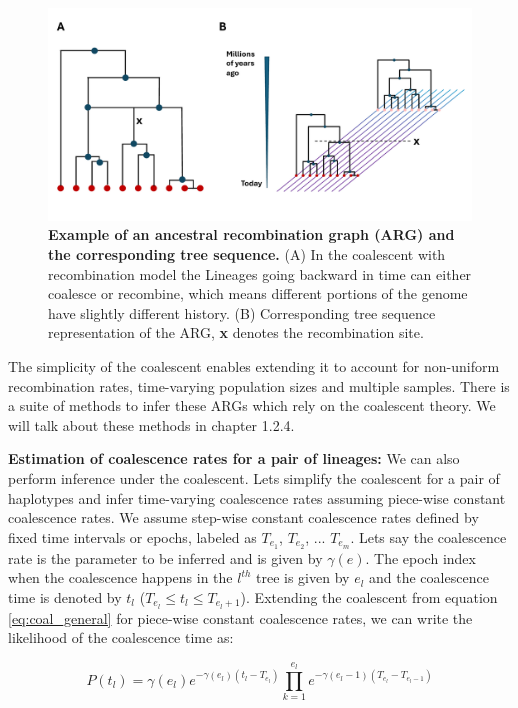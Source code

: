 \begin{figure}[h!]
    \centering
    \includegraphics[width=\linewidth]{figures/coalescent_arg.pdf}
    \caption{\textbf{Example of an ancestral recombination graph (ARG) and the corresponding tree sequence.} (A) In the coalescent with recombination model the Lineages going backward in time can either coalesce or recombine, which means different portions of the genome have slightly different history. (B) Corresponding tree sequence representation of the ARG, \textbf{x} denotes the recombination site.}
    \label{fig:arg}
\end{figure}

The simplicity of the coalescent enables extending it to account for non-uniform recombination rates, time-varying population sizes and multiple samples. There is a suite of methods to infer these ARGs which rely on the coalescent theory. We will talk about these methods in chapter 1.2.4.

\textbf{Estimation of coalescence rates for a pair of lineages:} We can also perform inference under the coalescent. Lets simplify the coalescent for a pair of haplotypes and infer time-varying coalescence rates assuming piece-wise constant coalescence rates. We assume step-wise constant coalescence rates defined by fixed time intervals or epochs, labeled as $T_{e_1}$,  $T_{e_2}$, ... $T_{e_m}$. Lets say the coalescence rate is the parameter to be inferred and is given by $\gamma(e)$. The epoch index when the coalescence happens in the $l^{th}$ tree is given by $e_l$ and  the coalescence time is denoted by $t_l$ ($T_{e_l} \leq t_l \leq T_{e_l + 1} $). Extending the coalescent from equation \ref{eq:coal_general} for piece-wise constant coalescence rates, we can write the likelihood of the coalescence time as:

\begin{equation}
    P(t_l) = \gamma(e_l) e^{  -\gamma(e_l) (t_l - T_{e_l}) } \prod_{k=1}^{e_l} e ^{  -\gamma(e_l - 1) (T_{e_l} - T_{e_l-1}) } 
\end{equation}

